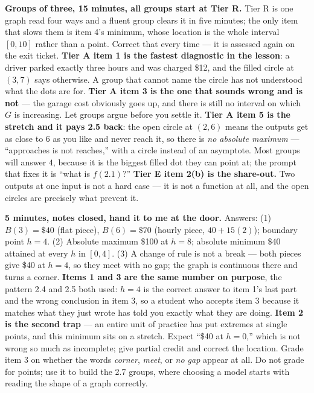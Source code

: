\documentclass[10pt]{article}
\begin{document}
\boxguard[18]
\begin{teachernote}
    \textbf{Groups of three, 15 minutes, all groups start at Tier R.} Tier R is one graph read four
    ways and a fluent group clears it in five minutes; the only item that slows them is item 4's
    minimum, whose location is the whole interval $[0,10]$ rather than a point. Correct that every
    time --- it is assessed again on the exit ticket. \textbf{Tier A item 1 is the fastest diagnostic
    in the lesson}: a driver parked exactly three hours and was charged \$12, and the filled circle at
    $(3,7)$ says otherwise. A group that cannot name the circle has not understood what the dots are
    for. \textbf{Tier A item 3 is the one that sounds wrong and is not} --- the garage cost obviously
    goes up, and there is still no interval on which $G$ is increasing. Let groups argue before you
    settle it. \textbf{Tier A item 5 is the stretch and it pays 2.5 back}: the open circle at $(2,6)$
    means the outputs get as close to $6$ as you like and never reach it, so there is \emph{no
    absolute maximum} --- ``approaches is not reaches,'' with a circle instead of an asymptote. Most
    groups will answer $4$, because it is the biggest filled dot they can point at; the prompt that
    fixes it is ``what is $f(2.1)$?'' \textbf{Tier E item 2(b) is the share-out.} Two outputs at one
    input is not a hard case --- it is not a function at all, and the open circles are precisely what
    prevent it.
\end{teachernote}

\boxguard[18]
\begin{teachernote}
    \textbf{5 minutes, notes closed, hand it to me at the door.} Answers: (1) $B(3)=\$40$ (flat
    piece), $B(6)=\$70$ (hourly piece, $40+15(2)$); boundary point $h=4$. (2) Absolute maximum \$100
    at $h=8$; absolute minimum \$40 attained at every $h$ in $[0,4]$. (3) A change of rule is not a
    break --- both pieces give \$40 at $h=4$, so they meet with no gap; the graph is continuous there
    and turns a corner. \textbf{Items 1 and 3 are the same number on purpose}, the pattern 2.4 and 2.5
    both used: $h=4$ is the correct answer to item 1's last part and the wrong conclusion in item 3, so
    a student who accepts item 3 because it matches what they just wrote has told you exactly what they
    are doing. \textbf{Item 2 is the second trap} --- an entire unit of practice has put extremes at
    single points, and this minimum sits on a stretch. Expect ``\$40 at $h=0$,'' which is not wrong so
    much as incomplete; give partial credit and correct the location. Grade item 3 on whether the words
    \emph{corner}, \emph{meet}, or \emph{no gap} appear at all. Do not grade for points; use it to
    build the 2.7 groups, where choosing a model starts with reading the shape of a graph correctly.
\end{teachernote}
\end{document}
